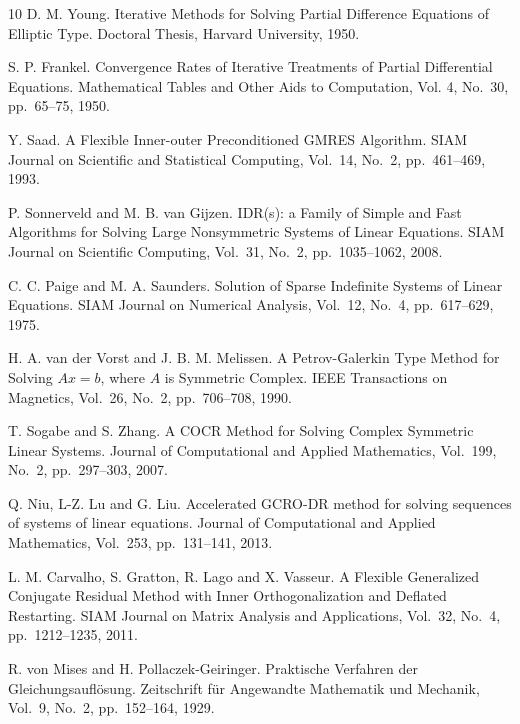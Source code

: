 \documentclass[a4paper]{article}
\begin{document}
\begin{thebibliography}{10}
D. M. Young.
\newblock Iterative Methods for Solving Partial Difference Equations of
	Elliptic Type.
\newblock Doctoral Thesis, Harvard University, 1950.

S. P. Frankel.
\newblock Convergence Rates of Iterative Treatments of Partial
	Differential Equations.
\newblock Mathematical Tables and Other Aids to Computation, Vol. 4, No.~30, 
	pp.\ 65--75, 1950.

Y. Saad.
\newblock A Flexible Inner-outer Preconditioned GMRES Algorithm.
\newblock SIAM Journal on Scientific and Statistical Computing, Vol.~14, No.~2, pp.\ 461--469, 1993.

P. Sonnerveld and M. B. van Gijzen.
\newblock IDR(s): a Family of Simple and Fast Algorithms for Solving Large Nonsymmetric Systems of Linear Equations.
\newblock SIAM Journal on Scientific Computing, Vol.~31, No.~2, pp.\ 1035--1062, 2008.

C. C. Paige and M. A. Saunders.
\newblock Solution of Sparse Indefinite Systems of Linear Equations.
\newblock SIAM Journal on Numerical Analysis, Vol.~12, No.~4, pp.\ 617--629, 1975.

H. A. van der Vorst and J. B. M. Melissen.
\newblock A Petrov-Galerkin Type Method for Solving $Ax=b$, where $A$ is Symmetric Complex.
\newblock IEEE Transactions on Magnetics, Vol.~26, No.~2, pp.\ 706--708, 1990.

T. Sogabe and S. Zhang.
\newblock A COCR Method for Solving Complex Symmetric Linear Systems.
\newblock Journal of Computational and Applied Mathematics, Vol.~199, No.~2, pp.\ 297--303, 2007.

Q. Niu, L-Z. Lu and G. Liu.
\newblock Accelerated GCRO-DR method for solving sequences of systems of linear equations.
\newblock Journal of Computational and Applied Mathematics, Vol.~253, pp.\ 131--141, 2013. 

L. M. Carvalho, S. Gratton, R. Lago and X. Vasseur.
\newblock A Flexible Generalized Conjugate Residual Method with Inner Orthogonalization and Deflated Restarting.
\newblock SIAM Journal on Matrix Analysis and Applications, Vol.~32, No.~4, pp.\ 1212--1235, 2011. 

R. von Mises and H. Pollaczek-Geiringer.
\newblock Praktische Verfahren der Gleichungsaufl\"osung.
\newblock Zeitschrift f\"ur Angewandte Mathematik und Mechanik, Vol.~9,
	No.~2, pp.\ 152--164, 1929.


\end{thebibliography}
\end{document}
